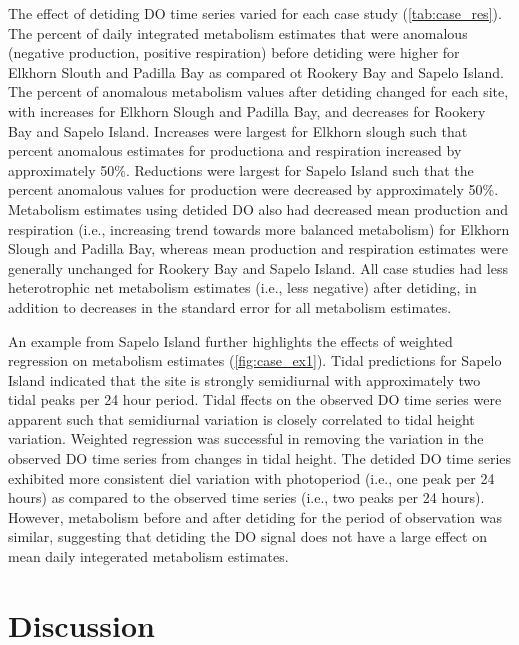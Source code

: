\documentclass[letterpaper,12pt,oneside]{article}\usepackage[]{graphicx}\usepackage[]{color}
\begin{document}
The effect of detiding \ac{DO} time series varied for each case study (\cref{tab:case_res}).  The percent of daily integrated metabolism estimates that were anomalous (negative production, positive respiration) before detiding were higher for Elkhorn Slouth and Padilla Bay as compared ot Rookery Bay and Sapelo Island.  The percent of anomalous metabolism values after detiding changed for each site, with increases for Elkhorn Slough and Padilla  Bay, and decreases for Rookery Bay and Sapelo Island.  Increases were largest for Elkhorn slough such that percent anomalous estimates for productiona and respiration increased by approximately 50\%.  Reductions were largest for Sapelo Island such that the percent anomalous values for production were decreased by approximately 50\%.  Metabolism estimates using detided \ac{DO} also had decreased mean production and respiration (i.e., increasing trend towards more balanced metabolism) for Elkhorn Slough  and Padilla Bay, whereas mean production and respiration estimates were generally unchanged for Rookery Bay and Sapelo Island.  All case studies had less heterotrophic net metabolism estimates (i.e., less negative) after detiding, in addition to decreases in the standard error for all metabolism estimates.

An example from Sapelo Island further highlights the effects of weighted regression on metabolism estimates (\cref{fig:case_ex1}).  Tidal predictions for Sapelo Island indicated that the site is strongly semidiurnal with approximately two tidal peaks per 24 hour period.  Tidal ffects on the observed \ac{DO} time series were apparent such that semidiurnal variation is closely correlated to tidal height variation.  Weighted regression was successful in removing the variation in the observed \ac{DO} time series from changes in tidal height.  The detided \ac{DO} time series exhibited more consistent diel variation with photoperiod (i.e., one peak per 24 hours) as compared to the observed time series (i.e., two peaks per 24 hours).  However, metabolism before and after detiding for the period of observation was similar, suggesting that detiding the \ac{DO} signal does not have a large effect on mean daily integerated metabolism estimates.

\section{Discussion}
\end{document}
